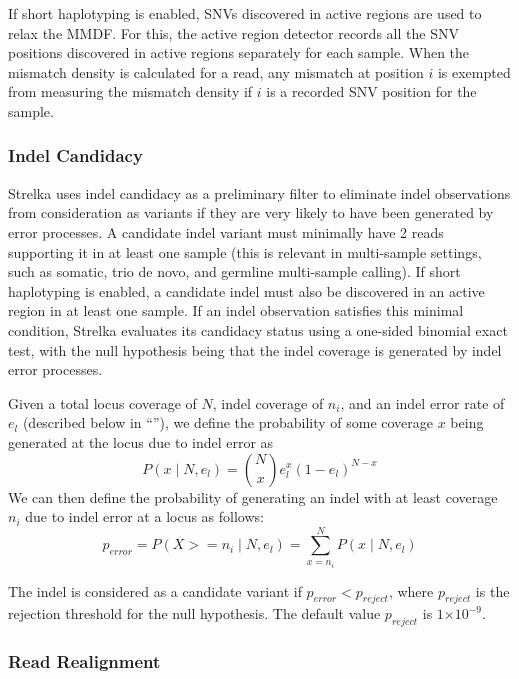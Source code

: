 \documentclass{article}
\newcommand{\e}[1]{\ensuremath{\times 10^{#1}}}
\begin{document}
If short haplotyping is enabled, SNVs discovered in active regions are used to relax the MMDF. For this, the active region detector records all the SNV positions discovered in active regions separately for each sample. When the mismatch density is calculated for a read, any mismatch at position $i$ is exempted from measuring the mismatch density if $i$ is a recorded SNV position for the sample.

\subsubsection{Indel Candidacy} \label{IndelCandidacy}

Strelka uses indel candidacy as a preliminary filter to eliminate indel observations from consideration as variants if they are very likely to have been generated by error processes.  A candidate indel variant must minimally have 2 reads supporting it in at least one sample (this is relevant in multi-sample settings, such as somatic, trio de novo, and germline multi-sample calling). If short haplotyping is enabled, a candidate indel must also be discovered in an active region in at least one sample. If an indel observation satisfies this minimal condition, Strelka evaluates its candidacy status using a one-sided binomial exact test, with the null hypothesis being that the indel coverage is generated by indel error processes.

Given a total locus coverage of $N$, indel coverage of $n_i$, and an indel error rate of $e_l$ (described below in ``''), we define the probability of some coverage $x$ being generated at the locus due to indel error as
\begin{equation*}
P(x \mid N, e_l) = \binom {N} {x} e^{x}_l (1 - e_l)^{N - x}
\end{equation*}
We can then define the probability of generating an indel with at least coverage $n_i$ due to indel error at a locus as follows:
\begin{equation*}
p_{error} = P(X >= n_i \mid N, e_l) = \sum_{x = n_i}^{N} P(x \mid N, e_l)
\end{equation*}

\noindent The indel is considered as a candidate variant if $p_{error} < p_{reject}$, where $p_{reject}$ is the rejection threshold for the null hypothesis. The default value $p_{reject}$ is $1\e{-9}$.

\subsubsection{Read Realignment}
\end{document}
